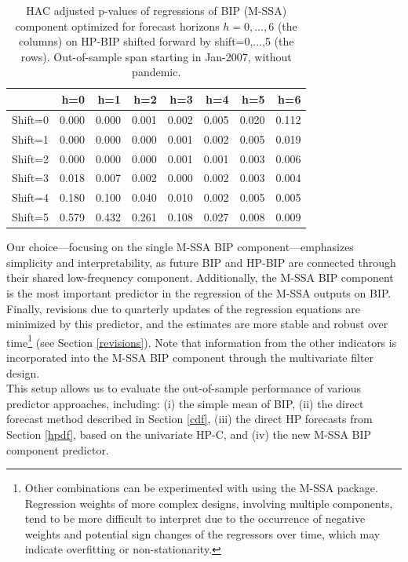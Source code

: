 \documentclass[a4paper]{article}
\begin{document}
\begin{table}[ht]
\centering
\begin{tabular}{rrrrrrrr}
  \hline
 & h=0 & h=1 & h=2 & h=3 & h=4 & h=5 & h=6 \\ 
  \hline
Shift=0 & 0.000 & 0.000 & 0.001 & 0.002 & 0.005 & 0.020 & 0.112 \\ 
  Shift=1 & 0.000 & 0.000 & 0.000 & 0.001 & 0.002 & 0.005 & 0.019 \\ 
  Shift=2 & 0.000 & 0.000 & 0.000 & 0.001 & 0.001 & 0.003 & 0.006 \\ 
  Shift=3 & 0.018 & 0.007 & 0.002 & 0.000 & 0.002 & 0.003 & 0.004 \\ 
  Shift=4 & 0.180 & 0.100 & 0.040 & 0.010 & 0.002 & 0.005 & 0.005 \\ 
  Shift=5 & 0.579 & 0.432 & 0.261 & 0.108 & 0.027 & 0.008 & 0.009 \\ 
   \hline
\end{tabular}
\caption{HAC adjusted p-values of regressions of BIP (M-SSA) component optimized for forecast horizons $h=0,...,6$  (the columns) on HP-BIP shifted forward by shift=0,...,5 (the rows). Out-of-sample span starting in Jan-2007, without pandemic.} 
\label{p_val_hpbip_wc}
\end{table}Our choice—focusing on the single M-SSA BIP component—emphasizes simplicity and interpretability, as future BIP and HP-BIP are connected through their shared low-frequency component. Additionally, the M-SSA BIP component is the most important predictor in the regression of the M-SSA outputs on BIP.  Finally, revisions due to quarterly updates of the regression equations are minimized by this predictor, and the estimates are more stable and robust over time\footnote{Other combinations can be experimented with using the M-SSA package. Regression weights of more complex designs, involving multiple components, tend to be more difficult to interpret due to the occurrence of negative weights and potential sign changes of the regressors over time, which may indicate overfitting or non-stationarity.} (see Section \eqref{revisions}). Note that information from the other  indicators is incorporated into the M-SSA BIP component through the multivariate filter design.\\



This setup allows us to evaluate the out-of-sample performance of various predictor approaches, including: (i) the simple mean of BIP, (ii) the direct forecast method described in Section \eqref{cdf}, (iii) the direct HP forecasts from Section \eqref{hpdf}, based on the univariate HP-C, and (iv) the new M-SSA BIP component predictor. %
\end{document}
